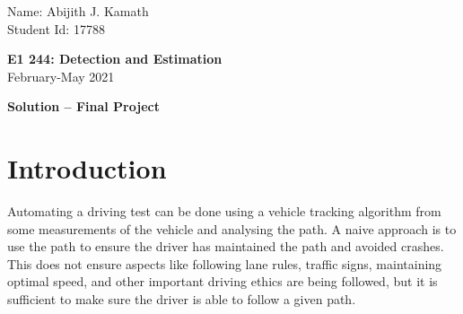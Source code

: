 \documentclass[11pt]{article}
\begin{document}
\thispagestyle{empty}

{\small
\begin{flushleft}
   Name: Abijith J. Kamath\\
   Student Id: 17788
\end{flushleft}
}
\vspace{2ex}
\begin{center}
    {\Large\bf E1 244: Detection and Estimation}\\
    February-May 2021

\vspace{5mm}
{\bf Solution -- Final Project}
\end{center}
\vspace{5mm}


\section*{Introduction}

Automating a driving test can be done using a vehicle tracking algorithm from some measurements of the vehicle and analysing the path. A naive approach is to use the path to ensure the driver has maintained the path and avoided crashes. This does not ensure aspects like following lane rules, traffic signs, maintaining optimal speed, and other important driving ethics are being followed, but it is sufficient to make sure the driver is able to follow a given path.
\end{document}
